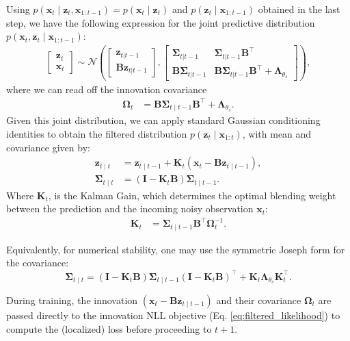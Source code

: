 \documentclass{article}
\theoremstyle{plain}
\theoremstyle{definition}
\theoremstyle{remark}
\begin{document}
Using $p(\bm x_t\mid\bm z_t, \bm x_{1:t-1})=p(\bm x_t\mid \bm z_t)$ and $p(\bm z_t\mid \bm x_{1:t-1})$ obtained in the last step, we have the following expression for the joint predictive distribution $p(\bm x_t,\bm z_t \mid \bm x_{1:t-1})$:
\begin{align*}
\begin{bmatrix}
\bm z_t \\
\bm x_t
\end{bmatrix}
\sim \mathcal{N}
\left(
\begin{bmatrix}
\bm z_{t|t-1} \\
\bm B\bm z_{t|t-1}
\end{bmatrix},
\begin{bmatrix}
\bm \Sigma_{t|t-1} & \bm \Sigma_{t|t-1} \bm B^\top \\
\bm B \bm \Sigma_{t|t-1} & \bm B \bm \Sigma_{t|t-1} \bm B^\top + \bm{\Lambda}_{\theta_s}
\end{bmatrix}
\right),
\end{align*}
where we can read off the innovation covariance
\begin{align}
\bm{\Omega}_t &= \bm{B} \bm{\Sigma}_{t\mid t-1} \bm{B}^\top + \bm{\Lambda}_{\theta_s}. \label{eq:kf_innovation_cov} 
\end{align}
Given this joint distribution, we can apply standard Gaussian conditioning identities to obtain the filtered distribution $p(\bm z_t \mid \bm x_{1:t})$, with mean and covariance given by:
\begin{align}
\bm{z}_{t\mid t} &= \bm{z}_{t\mid t-1} + \bm{K}_t (\bm{x}_t - \bm{B} \bm{z}_{t\mid t-1}), \label{eq:kf_update_mean} \\
\bm{\Sigma}_{t\mid t} &= (\bm{I} - \bm{K}_t \bm{B}) \bm{\Sigma}_{t\mid t-1}. \label{eq:kf_update_cov}
\end{align}
Where $\bm{K}_t$, is the Kalman Gain, which determines the optimal blending weight between the prediction and the incoming noisy observation $\bm{x}_t$:
\begin{align}
\bm{K}_t &= \bm{\Sigma}_{t\mid t-1} \bm{B}^\top \bm{\Omega}_t^{-1} .\label{eq:kf_gain}
\end{align}

Equivalently, for numerical stability, one may use the symmetric Joseph form for the covariance:
\[
\bm{\Sigma}_{t\mid t}=(\bm I-\bm K_t\bm B)\bm\Sigma_{t\mid t-1}(\bm I-\bm K_t\bm B)^\top+\bm K_t\bm\Lambda_{\theta_s}\bm K_t^\top.
\]

During training, the innovation $(\bm{x}_t - \bm{B} \bm{z}_{t\mid t-1})$ and their covariance $\bm{\Omega}_t$ are passed directly to the innovation NLL objective (Eq. \ref{eq:filtered_likelihood}) to compute the (localized) loss before proceeding to $t+1$.
\end{document}
